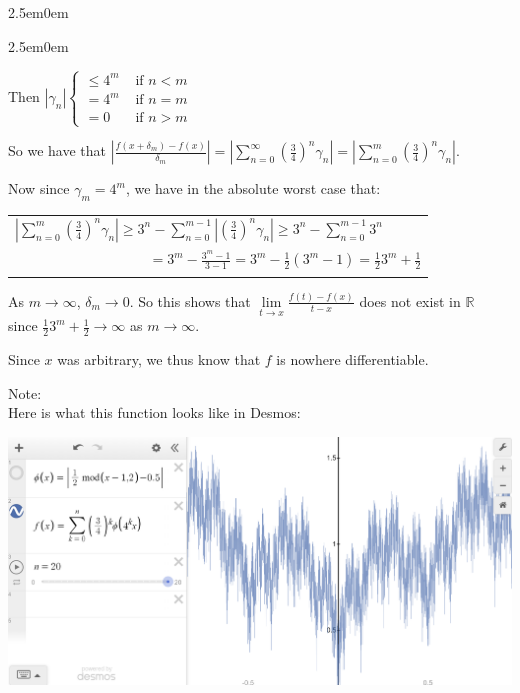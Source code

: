 \documentclass{book}
\newcommand{\hFour}{%
   \color{Cerulean}
   \fontsize{12}{14}\selectfont%
}
\newenvironment{myIndent}{%
   \begin{adjustwidth}{2.5em}{0em}%
}{%
   \end{adjustwidth}%
}
\newcommand{\retTwo}{\hfill\bigbreak}
\begin{document}
\begin{myIndent}
{\begin{myIndent}
      Then $|\gamma_n| \left\{
      \begin{matrix}
         \leq 4^m & \text { if } n < m \\
         = 4^m & \text{ if } n = m \\
         = 0^{\phantom{m}} & \text { if } n > m
      \end{matrix}\right.$\retTwo

      So we have that $\left|\frac{f(x + \delta_m) - f(x)}{\delta_m}\right| = \left|\sum\limits_{n=0}^\infty\left(\frac{3}{4}\right)^n \gamma_n\right| = \left|\sum\limits_{n=0}^m \left(\frac{3}{4}\right)^n \gamma_n\right|$.\retTwo

      Now since $\gamma_m = 4^m$, we have in the absolute worst case that:
      
      {\centering 
      \begin{tabular}{l}
         $\left|\sum\limits_{n=0}^m \left(\frac{3}{4}\right)^n \gamma_n\right| \geq 3^n - \sum\limits_{n=0}^{m-1}\left|\left(\frac{3}{4}\right)^n \gamma_n\right| \geq 3^n - \sum\limits_{n=0}^{m-1} 3^n$\\

         $\phantom{\left|\sum\limits_{n=0}^m \left(\frac{3}{4}\right)^n \gamma_n\right| aaaa} = 3^m - \frac{3^m - 1}{3 - 1} = 3^m - \frac{1}{2}\left(3^m - 1\right) = \frac{1}{2} 3^m + \frac{1}{2}$
      \end{tabular} \retTwo\par}

      As $m \rightarrow \infty$, $\delta_m \rightarrow 0$. So this shows that $\lim\limits_{t\rightarrow x}\frac{f(t) - f(x)}{t - x}$ does not exist in $\mathbb{R}$\\ [-5pt] since $\frac{1}{2}3^m + \frac{1}{2} \rightarrow \infty$ as $m \rightarrow \infty$.\retTwo

      Since $x$ was arbitrary, we thus know that $f$ is nowhere differentiable.

      \newpage

      \hFour

      Note:\\
      Here is what this function looks like in Desmos:\\

      \begin{center}
         \includegraphics[scale=0.35]{Desmos_how_to.png}\retTwo
      \end{center}


\end{myIndent}}
\end{myIndent}
\end{document}
